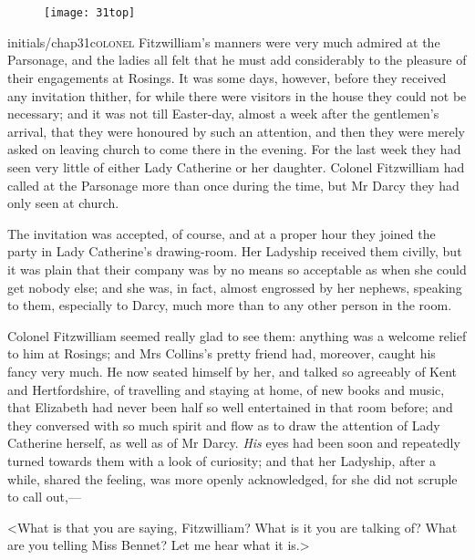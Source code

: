 \chapter[Chapter \thechapter]{}
	
\begin{figure}[t!]
\centering
\texttt{[image: 31top]}
\end{figure}


\lettrine[lines=6,image=true]{initials/chap31c}{olonel}  Fitzwilliam's manners were very much admired at the Parsonage, and the ladies all felt that he must add considerably to the pleasure of their engagements at Rosings. It was some days, however, before they received any invitation thither, for while there were visitors in the house they could not be necessary; and it was not till Easter-day, almost a week after the gentlemen's arrival, that they were honoured by such an attention, and then they were merely asked on leaving church to come there in the evening. For the last week they had seen very little of either Lady Catherine or her daughter. Colonel Fitzwilliam had called at the Parsonage more than once during the time, but Mr Darcy they had only seen at church.

The invitation was accepted, of course, and at a proper hour they joined the party in Lady Catherine's drawing-room. Her Ladyship received them civilly, but it was plain that their company was by no means so acceptable as when she could get nobody else; and she was, in fact, almost engrossed by her nephews, speaking to them, especially to Darcy, much more than to any other person in the room.

Colonel Fitzwilliam seemed really glad to see them: anything was a welcome relief to him at Rosings; and Mrs Collins's pretty friend had, moreover, caught his fancy very much. He now seated himself by her, and talked so agreeably of Kent and Hertfordshire, of travelling and staying at home, of new books and music, that Elizabeth had never been half so well entertained in that room before; and they conversed with so much spirit and flow as to draw the attention of Lady Catherine herself, as well as of Mr Darcy. \textit{His} eyes had been soon and repeatedly turned towards them with a look of curiosity; and that her Ladyship, after a while, shared the feeling, was more openly acknowledged, for she did not scruple to call out,—

<What is that you are saying, Fitzwilliam? What is it you are talking of? What are you telling Miss Bennet? Let me hear what it is.>

